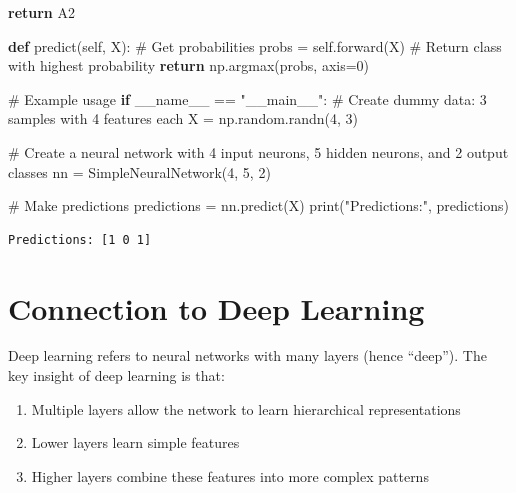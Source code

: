\documentclass[
  letterpaper,
  DIV=11,
  numbers=noendperiod]{scrreprt}
\newenvironment{Shaded}{\begin{snugshade}}{\end{snugshade}}
\newcommand{\BuiltInTok}[1]{\textcolor[rgb]{0.00,0.23,0.31}{#1}}
\newcommand{\CommentTok}[1]{\textcolor[rgb]{0.37,0.37,0.37}{#1}}
\newcommand{\ControlFlowTok}[1]{\textcolor[rgb]{0.00,0.23,0.31}{\textbf{#1}}}
\newcommand{\DecValTok}[1]{\textcolor[rgb]{0.68,0.00,0.00}{#1}}
\newcommand{\KeywordTok}[1]{\textcolor[rgb]{0.00,0.23,0.31}{\textbf{#1}}}
\newcommand{\NormalTok}[1]{\textcolor[rgb]{0.00,0.23,0.31}{#1}}
\newcommand{\OperatorTok}[1]{\textcolor[rgb]{0.37,0.37,0.37}{#1}}
\newcommand{\StringTok}[1]{\textcolor[rgb]{0.13,0.47,0.30}{#1}}
\newcommand{\VariableTok}[1]{\textcolor[rgb]{0.07,0.07,0.07}{#1}}
\providecommand{\tightlist}{%
  \setlength{\itemsep}{0pt}\setlength{\parskip}{0pt}}\usepackage{longtable,booktabs,array}
\begin{document}
\begin{Shaded}
\begin{Highlighting}[]
        \ControlFlowTok{return}\NormalTok{ A2}
    
    \KeywordTok{def}\NormalTok{ predict(}\VariableTok{self}\NormalTok{, X):}
        \CommentTok{\# Get probabilities}
\NormalTok{        probs }\OperatorTok{=} \VariableTok{self}\NormalTok{.forward(X)}
        \CommentTok{\# Return class with highest probability}
        \ControlFlowTok{return}\NormalTok{ np.argmax(probs, axis}\OperatorTok{=}\DecValTok{0}\NormalTok{)}

\CommentTok{\# Example usage}
\ControlFlowTok{if} \VariableTok{\_\_name\_\_} \OperatorTok{==} \StringTok{"\_\_main\_\_"}\NormalTok{:}
    \CommentTok{\# Create dummy data: 3 samples with 4 features each}
\NormalTok{    X }\OperatorTok{=}\NormalTok{ np.random.randn(}\DecValTok{4}\NormalTok{, }\DecValTok{3}\NormalTok{)}
    
    \CommentTok{\# Create a neural network with 4 input neurons, 5 hidden neurons, and 2 output classes}
\NormalTok{    nn }\OperatorTok{=}\NormalTok{ SimpleNeuralNetwork(}\DecValTok{4}\NormalTok{, }\DecValTok{5}\NormalTok{, }\DecValTok{2}\NormalTok{)}
    
    \CommentTok{\# Make predictions}
\NormalTok{    predictions }\OperatorTok{=}\NormalTok{ nn.predict(X)}
    \BuiltInTok{print}\NormalTok{(}\StringTok{"Predictions:"}\NormalTok{, predictions)}
\end{Highlighting}
\end{Shaded}

\begin{verbatim}
Predictions: [1 0 1]
\end{verbatim}

\section{Connection to Deep Learning}\label{connection-to-deep-learning}

Deep learning refers to neural networks with many layers (hence
``deep''). The key insight of deep learning is that:

\begin{enumerate}
\def\labelenumi{\arabic{enumi}.}
\tightlist
\item
  Multiple layers allow the network to learn hierarchical
  representations
\item
  Lower layers learn simple features
\item
  Higher layers combine these features into more complex patterns
\end{enumerate}
\end{document}
